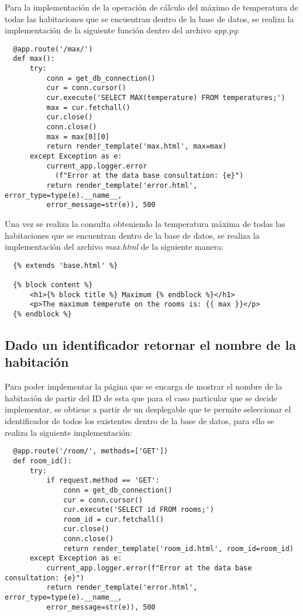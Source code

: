 \documentclass[11pt]{report}
\begin{document}
Para la implementación de la operación de cálculo del máximo de temperatura de todas las habitaciones que se encuentran dentro de la base de datos, se realiza la implementación de la siguiente función dentro del archivo \emph{app.py}:

\begin{verbatim}
  @app.route('/max/')
  def max():
      try:
          conn = get_db_connection()
          cur = conn.cursor()
          cur.execute('SELECT MAX(temperature) FROM temperatures;')
          max = cur.fetchall()
          cur.close()
          conn.close()
          max = max[0][0]
          return render_template('max.html', max=max)
      except Exception as e:
          current_app.logger.error
            (f"Error at the data base consultation: {e}")
          return render_template('error.html', error_type=type(e).__name__,
          error_message=str(e)), 500
\end{verbatim}

Una vez se realiza la consulta obteniendo la temperatura máxima de todas las habitaciones que se encuentran dentro de la base de datos, se realiza la implementación del archivo \emph{max.html} de la siguiente manera:

\begin{verbatim}
  {% extends 'base.html' %}

  {% block content %}
      <h1>{% block title %} Maximum {% endblock %}</h1>
      <p>The maximum temperute on the rooms is: {{ max }}</p>
  {% endblock %}
\end{verbatim}

\subsection{Dado un identificador retornar el nombre de la habitación}

Para poder implementar la página que se encarga de mostrar el nombre de la habitación de partir del ID de esta que para el caso particular que se decide implementar, se obtiene a partir de un desplegable que te permite seleccionar el identificador de todos los existentes dentro de la base de datos, para ello se realiza la siguiente implementación:

\begin{verbatim}
  @app.route('/room/', methods=['GET'])
  def room_id():
      try:
          if request.method == 'GET':
              conn = get_db_connection()
              cur = conn.cursor()
              cur.execute('SELECT id FROM rooms;')
              room_id = cur.fetchall()
              cur.close()
              conn.close()
              return render_template('room_id.html', room_id=room_id)
      except Exception as e:
          current_app.logger.error(f"Error at the data base consultation: {e}")
          return render_template('error.html', error_type=type(e).__name__, 
          error_message=str(e)), 500
\end{verbatim}
\end{document}
